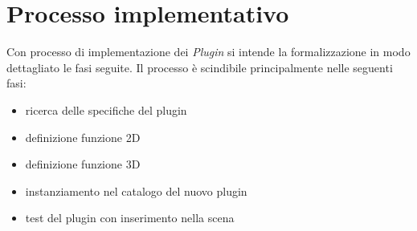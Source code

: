 \section{Processo implementativo}
\label{sec:chapter_3_section_5}

Con processo di implementazione dei \emph{Plugin} si intende la formalizzazione in modo dettagliato le fasi seguite.
Il processo è scindibile principalmente nelle seguenti fasi:
\begin{itemize}
  \item ricerca delle specifiche del plugin
  \item definizione funzione 2D
  \item definizione funzione 3D
  \item instanziamento nel catalogo del nuovo plugin
  \item test del plugin con inserimento nella scena
\end{itemize}
